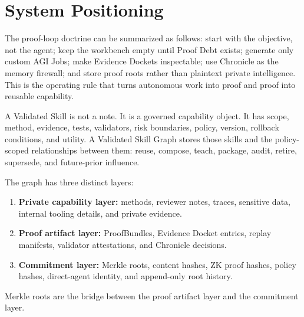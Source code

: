 \documentclass[11pt,letterpaper]{article}
\begin{document}
\section{System Positioning}
The proof-loop doctrine can be summarized as follows: start with the objective, not the agent; keep the workbench empty until Proof Debt exists; generate only custom AGI Jobs; make Evidence Dockets inspectable; use Chronicle as the memory firewall; and store proof roots rather than plaintext private intelligence. This is the operating rule that turns autonomous work into proof and proof into reusable capability.

A Validated Skill is not a note. It is a governed capability object. It has scope, method, evidence, tests, validators, risk boundaries, policy, version, rollback conditions, and utility. A Validated Skill Graph stores those skills and the policy-scoped relationships between them: reuse, compose, teach, package, audit, retire, supersede, and future-prior influence.

The graph has three distinct layers:
\begin{enumerate}
\item \textbf{Private capability layer:} methods, reviewer notes, traces, sensitive data, internal tooling details, and private evidence.
\item \textbf{Proof artifact layer:} ProofBundles, Evidence Docket entries, replay manifests, validator attestations, and Chronicle decisions.
\item \textbf{Commitment layer:} Merkle roots, content hashes, ZK proof hashes, policy hashes, direct-agent identity, and append-only root history.
\end{enumerate}
Merkle roots are the bridge between the proof artifact layer and the commitment layer.
\end{document}
